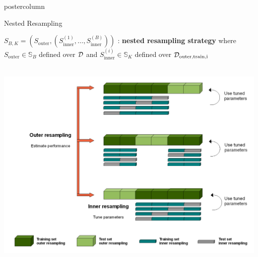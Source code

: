 \documentclass{beamer}
\begin{document}
\begin{frame}[fragile]{}
\begin{columns}
\begin{column}{.31\textwidth}
\begin{beamercolorbox}[center]{postercolumn}
\begin{minipage}{.98\textwidth}
{%
\begin{myblock}{Nested Resampling}

$S_{B, K} = \left(S_{\mathrm{outer}}, \left(S_{\mathrm{inner}}^{(1)},\dots,S_{\mathrm{inner}}^{(B)}
\right)\right)$ : \textbf{nested resampling strategy} where $S_{\mathrm{outer}} \in \mathds{S}_B$ defined over $\mathcal{D}$ and $S_{\mathrm{inner}}^{(i)} \in \mathds{S}_K$ defined over $\mathcal{D}_{\textrm{outer,train,i}}$\\\

 \begin{center}
             \includegraphics[width=0.9\columnwidth]{img/tuning_2.PNG}
               \end{center}

\end{myblock}

			  }
			\end{minipage}
		\end{beamercolorbox}
	\end{column}
\end{columns}

\end{frame}
\end{document}
